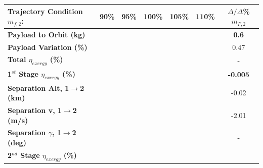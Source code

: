 \begin{table}[ht]%
	\centering
\begin{tabular}{l c c c c c c} 
	\hline \textbf{Trajectory Condition}   \qquad  $m_{f,2}$:
	&90\%
	&95\%
	&100\%
	&105\%
	&110\%
	& $\Delta/\Delta$\%$m_{F,2}$
	\\
	\hline \textbf{Payload to Orbit (kg)}
	& \textbf{\PayloadToOrbitmFuelNinety}
	& \textbf{\PayloadToOrbitmFuelNinetyFive}
	& \textbf{\PayloadToOrbitmFuelStandard}
	& \textbf{\PayloadToOrbitmFuelOneHundredFive}
	& \textbf{\PayloadToOrbitmFuelOneHundredTen}
	&\textbf{0.6}
	\\
	\textbf{Payload Variation (\%)}
	& \PayloadVarmFuelNinety
	& \PayloadVarmFuelNinetyFive
	& \PayloadVarmFuelStandard
	& \PayloadVarmFuelOneHundredFive
	& \PayloadVarmFuelOneHundredTen
	&0.47
	\\
	\textbf{Total $\eta_{exergy}$ (\%)}
	& \textbf{\totalExergyEffmFuelNinety}
	& \textbf{\totalExergyEffmFuelNinetyFive}
	& \textbf{\totalExergyEffmFuelStandard}
	& \textbf{\totalExergyEffmFuelOneHundredFive}
	& \textbf{\totalExergyEffmFuelOneHundredTen}
	& -
	\\
	\hline 
	\textbf{1$^{st}$ Stage $\eta_{exergy}$ (\%)}
	& \textbf{\firstExergyEffmFuelNinety}
	& \textbf{\firstExergyEffmFuelNinetyFive}
	& \textbf{\firstExergyEffmFuelStandard}
	& \textbf{\firstExergyEffmFuelOneHundredFive}
	& \textbf{\firstExergyEffmFuelOneHundredTen}
	& \textbf{-0.005}
	\\
	\textbf{Separation Alt, 1$\rightarrow$2 (km)}
	& \firstsecondSeparationAltmFuelNinety
	& \firstsecondSeparationAltmFuelNinetyFive
	& \firstsecondSeparationAltmFuelStandard
	& \firstsecondSeparationAltmFuelOneHundredFive
	& \firstsecondSeparationAltmFuelOneHundredTen
	&-0.02
	\\
	\textbf{Separation v, 1$\rightarrow$2 (m/s)}
	& \firstsecondSeparationvmFuelNinety
	& \firstsecondSeparationvmFuelNinetyFive
	& \firstsecondSeparationvmFuelStandard
	& \firstsecondSeparationvmFuelOneHundredFive
	& \firstsecondSeparationvmFuelOneHundredTen
	&-2.01
	\\
	\textbf{Separation $\gamma$, 1$\rightarrow$2 (deg)}
	& \firstsecondSeparationgammamFuelNinety
	& \firstsecondSeparationgammamFuelNinetyFive
	& \firstsecondSeparationgammamFuelStandard
	& \firstsecondSeparationgammamFuelOneHundredFive
	& \firstsecondSeparationgammamFuelOneHundredTen
	& -
	\\
	\hline 
	\textbf{2$^{nd}$ Stage $\eta_{exergy}$ (\%)}
	& \textbf{\secondExergyEffmFuelNinety}
	& \textbf{\secondExergyEffmFuelNinetyFive}

\end{tabular}
\end{table}
